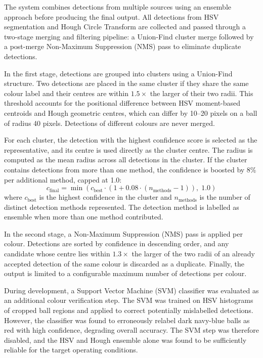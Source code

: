 The system combines detections from multiple sources using an ensemble approach
before producing the final output. All detections from HSV segmentation and Hough
Circle Transform are collected and passed through a two-stage merging and filtering pipeline: a Union-Find cluster merge followed by a post-merge Non-Maximum Suppression (NMS) pass to eliminate duplicate detections.

In the first stage, detections are grouped into clusters using a Union-Find
structure. Two detections are placed in the same cluster if they share the same
colour label and their centres are within $1.5\times$ the larger of their two
radii. This threshold accounts for the positional difference between HSV
moment-based centroids and Hough geometric centres, which can differ by 10--20
pixels on a ball of radius 40 pixels. Detections of different colours are never
merged.

For each cluster, the detection with the highest confidence score is selected as
the representative, and its centre is used directly as the cluster centre. The
radius is computed as the mean radius across all detections in the cluster. If the
cluster contains detections from more than one method, the confidence is boosted by
8\% per additional method, capped at 1.0:
\begin{equation}
    c_{\mathrm{final}} = \min\!\left(c_{\mathrm{best}} \cdot
    \left(1 + 0.08 \cdot (n_{\mathrm{methods}} - 1)\right),\; 1.0\right)
\end{equation}
where $c_{\mathrm{best}}$ is the highest confidence in the cluster and
$n_{\mathrm{methods}}$ is the number of distinct detection methods represented.
The detection method is labelled as ensemble when more than one method contributed.

In the second stage, a Non-Maximum Suppression (NMS) pass is applied per colour.
Detections are sorted by confidence in descending order, and any candidate whose
centre lies within $1.3\times$ the larger of the two radii of an already accepted
detection of the same colour is discarded as a duplicate. Finally, the output is
limited to a configurable maximum number of detections per colour.

During development, a Support Vector Machine (SVM) classifier was evaluated as an
additional colour verification step. The SVM was trained on HSV histograms of
cropped ball regions and applied to correct potentially mislabelled detections.
However, the classifier was found to erroneously relabel dark navy-blue balls as
red with high confidence, degrading overall accuracy. The SVM step was therefore
disabled, and the HSV and Hough ensemble alone was found to be sufficiently
reliable for the target operating conditions.

